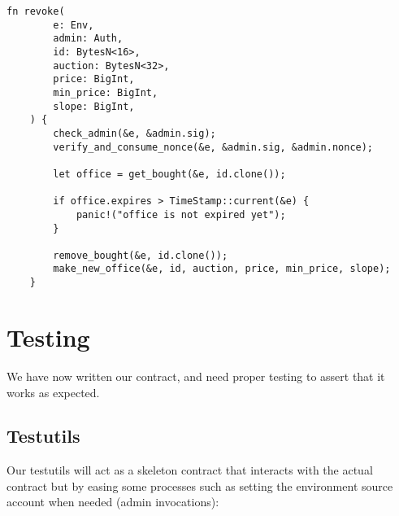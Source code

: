 \documentclass[10pt]{article}
\begin{document}
\begin{verbatim}
fn revoke(
        e: Env,
        admin: Auth,
        id: BytesN<16>,
        auction: BytesN<32>,
        price: BigInt,
        min_price: BigInt,
        slope: BigInt,
    ) {
        check_admin(&e, &admin.sig);
        verify_and_consume_nonce(&e, &admin.sig, &admin.nonce);

        let office = get_bought(&e, id.clone());

        if office.expires > TimeStamp::current(&e) {
            panic!("office is not expired yet");
        }

        remove_bought(&e, id.clone());
        make_new_office(&e, id, auction, price, min_price, slope);
    }
\end{verbatim}

\section*{Testing}
We have now written our contract, and need proper testing to assert that it works as expected.

\subsection*{Testutils}
Our testutils will act as a skeleton contract that interacts with the actual contract but by easing some processes such as setting the environment source account when needed (admin invocations):
\end{document}
